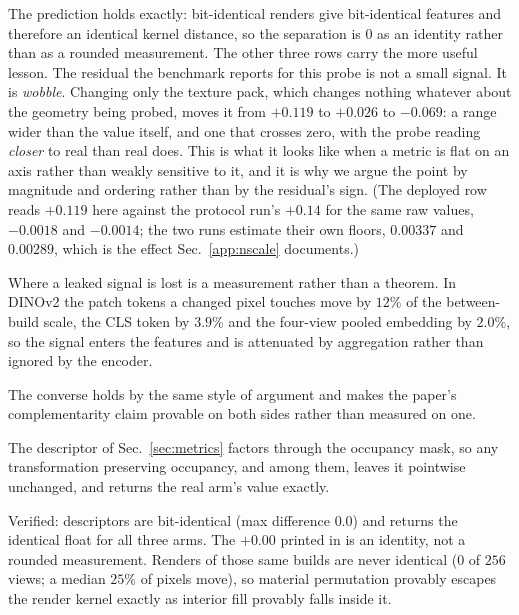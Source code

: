 The prediction holds exactly: bit-identical renders give bit-identical features
and therefore an identical kernel distance, so the separation is $0$ as an
identity rather than as a rounded measurement. The other three rows carry the
more useful lesson. The residual the benchmark reports for this probe is not a
small signal. It is \emph{wobble}. Changing only the texture pack, which
changes nothing whatever about the geometry being probed, moves it from $+0.119$
to $+0.026$ to $-0.069$: a range wider than the value itself, and one that crosses
zero, with the probe reading \emph{closer} to real than real does. This is what
it looks like when a metric is flat on an axis rather than weakly sensitive to
it, and it is why we argue the point by magnitude and ordering rather than by
the residual's sign. (The deployed row reads $+0.119$ here against the
protocol run's $+0.14$ for the same raw values, $-0.0018$ and $-0.0014$; the two runs
estimate their own floors, $0.00337$ and $0.00289$, which is the effect
Sec.~\ref{app:nscale} documents.)

Where a leaked signal is lost is a measurement rather than a theorem. In DINOv2
the patch tokens a changed pixel touches move by $12\%$ of the between-build
scale, the CLS token by $3.9\%$ and the four-view pooled embedding by $2.0\%$, so
the signal enters the features and is attenuated by aggregation rather than
ignored by the encoder.

The converse holds by the same style of argument and makes the paper's
complementarity claim provable on both sides rather than measured on one.

\begin{lemma}\label{lem:matblind}
The descriptor of Sec.~\ref{sec:metrics} factors through the occupancy mask, so any
transformation preserving occupancy, \matshuffle{} and \monochrome{} among them,
leaves
it pointwise unchanged, and \vkid{} returns the real arm's value exactly.
\end{lemma}

Verified: descriptors are bit-identical (max difference $0.0$) and \vkid{}
returns the identical float for all three arms. The $+0.00$ printed in
 is an identity, not a rounded measurement. Renders
of those same builds are never identical ($0$ of $256$ views; a median $25\%$ of
pixels move), so material permutation provably escapes the render kernel exactly
as interior fill provably falls inside it.

